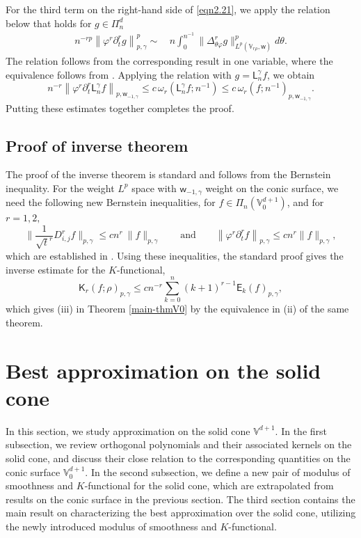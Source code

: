 \documentclass{amsart}
\theoremstyle{remark}
\def\g{{\gamma}}
\def\t{{\theta}}
\def\o{{\omega}}
\def\VV{{\mathbb V}}
\def\sE{{\mathsf E}}
\def\sK{{\mathsf K}}
\def\sL{{\mathsf L}}
\def\sw{{\mathsf w}}
\def\g{{\gamma}}
\def\t{{\theta}}
\def\o{{\omega}}
\def\VV{{\mathbb V}}
\def\f{\frac}
\def\f{\frac}
\begin{document}
For the third term on the right-hand side of \eqref{eqn2.21}, we apply the relation below that holds for $g \in\Pi_n^d$
\begin{align*}
   n^{-rp}\left \|\varphi^r \partial_t^r g \right \|_{p,\g}^p \sim\, & n  \int_0^{n^{-1}} \|\Delta_{\t\varphi}^r g \|^p_{L^p(\VV_{r\rho}, \sw)} d\t .
\end{align*} 
The relation follows from the corresponding result in one variable, where the equivalence follows from 
\cite[p. 57]{DT}. Applying the relation with $g = \sL^\g_n f$, we obtain
$$
 n^{-r} \left \|\varphi^r \partial_t^r \sL_n^\g f \right \|_{p, \sw_{-1,\g}}
       \le c \, \o_r \left(\sL_n^\g f; n^{-1}\right) \le c\, \o_r( f; n^{-1})_{p, \sw_{-1,\g}}.
$$
Putting these estimates together completes the proof. 

\subsection{Proof of inverse theorem} 
The proof of the inverse theorem is standard and follows from the Bernstein inequality. For the weight $L^p$ space 
with $\sw_{-1,\g}$ weight on the conic surface, we need the following new Bernstein inequalities, for $f \in \Pi_n(\VV_0^{d+1})$, and for $r=1,2,$ 
\begin{equation}
 \Big\|\f{1}{\sqrt{t}^r}D_{i,j}^r f\Big \|_{p,\gamma}\leq c n^r\ \| f \|_{p,\gamma} \quad\quad \text{and} \quad\quad
   \left \|\varphi^r\partial_t^r f \right \|_{p,\gamma}\leq c n^r\|f \|_{p,\gamma},
\end{equation}  
which are established in \cite[Theorem 2.1]{X23}. Using these inequalities, the standard proof gives the inverse 
estimate for the $K$-functional, 
$$
   \sK_r(f; \rho)_{p,\g } \le c n^{-r} \sum_{k=0}^n (k+1)^{r-1}\sE_k(f)_{p,\g},
$$ 
which gives (iii) in Theorem \ref{main-thmV0} by the equivalence in (ii) of the same theorem. 	

\section{Best approximation on the solid cone}
\setcounter{equation}{0}

In this section, we study approximation on the solid cone $\VV^{d+1}$. In the first subsection, we review
orthogonal polynomials and their associated kernels on the solid cone, and discuss their close relation 
to the corresponding quantities on the conic surface $\VV_0^{d+1}$. In the second subsection, we define 
a new pair of modulus of smoothness and $K$-functional for the solid cone, which are extrapolated from 
results on the conic surface in the previous section. The third section contains the main result on 
characterizing the best approximation over the solid cone, utilizing the newly introduced modulus of 
smoothness and $K$-functional. 
\end{document}
